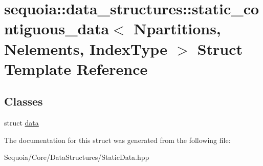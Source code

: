 \hypertarget{structsequoia_1_1data__structures_1_1static__contiguous__data}{}\section{sequoia\+::data\+\_\+structures\+::static\+\_\+contiguous\+\_\+data$<$ Npartitions, Nelements, Index\+Type $>$ Struct Template Reference}
\label{structsequoia_1_1data__structures_1_1static__contiguous__data}
\subsection*{Classes}
\begin{DoxyCompactItemize}
\item 
struct \mbox{\hyperlink{structsequoia_1_1data__structures_1_1static__contiguous__data_1_1data}{data}}
\end{DoxyCompactItemize}


The documentation for this struct was generated from the following file\+:\begin{DoxyCompactItemize}
\item 
Sequoia/\+Core/\+Data\+Structures/Static\+Data.\+hpp\end{DoxyCompactItemize}
